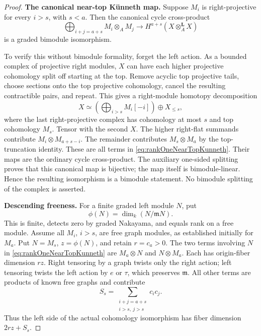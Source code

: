 \begin{proof}
\par\smallskip\noindent\textbf{The canonical near-top K\"unneth map.}\quad
Suppose \(M_i\) is right-projective for every \(i>s\),
with \(s<a\). Then the canonical cycle cross-product
\begin{equation}\label{eq:rankOneNearTopKunneth}
 \bigoplus_{i+j=a+s}M_i\otimes_AM_j
       \longrightarrow H^{a+s}(X\otimes_A^{\mathbf L}X)
\end{equation}
is a graded bimodule isomorphism.

To verify this without bimodule formality, forget the
left action. As a bounded complex of projective right
modules, \(X\) can have each higher projective cohomology
split off starting at the top. Remove acyclic top
projective tails, choose sections onto the top projective
cohomology, cancel the resulting contractible pairs,
and repeat. This gives a right-module homotopy decomposition
\[
 X\simeq\left(\bigoplus_{i>s}M_i[-i]\right)\oplus X_{\le s},
\]
where the last right-projective complex has cohomology
at most \(s\) and top cohomology \(M_s\).
Tensor with the second \(X\). The higher right-flat
summands contribute \(M_i\otimes M_{a+s-i}\).
The remainder contributes \(M_s\otimes M_a\) by
the top-truncation identity. These are all terms
in \eqref{eq:rankOneNearTopKunneth}.
Their maps are the ordinary cycle cross-product.
The auxiliary one-sided splitting proves that this
canonical map is bijective; the map itself is
bimodule-linear. Hence the resulting isomorphism
is a bimodule statement. No bimodule splitting of
the complex is asserted.

\par\smallskip\noindent\textbf{Descending freeness.}\quad
For a finite graded left module \(N\), put
\[
 \phi(N)=\dim_k(N/\mathfrak mN).
\]
This is finite, detects zero by graded Nakayama,
and equals rank on a free module.
Assume all \(M_i\), \(i>s\), are free graph modules,
as established initially for \(M_a\).
Put \(N=M_s\), \(z=\phi(N)\), and retain \(r=c_a>0\).
The two terms involving \(N\) in
\eqref{eq:rankOneNearTopKunneth} are
\(M_a\otimes N\) and \(N\otimes M_a\).
Each has origin-fiber dimension \(rz\).
Right tensoring by a graph twists only the right
action; left tensoring twists the left action by
\(e\) or \(\tau\), which preserves \(\mathfrak m\).
All other terms are products of known free graphs
and contribute
\[
 S_s=\sum_{\substack{i+j=a+s\\i>s,\ j>s}}c_i c_j.
\]
Thus the left side of the actual cohomology
isomorphism has fiber dimension \(2rz+S_s\).


\end{proof}
